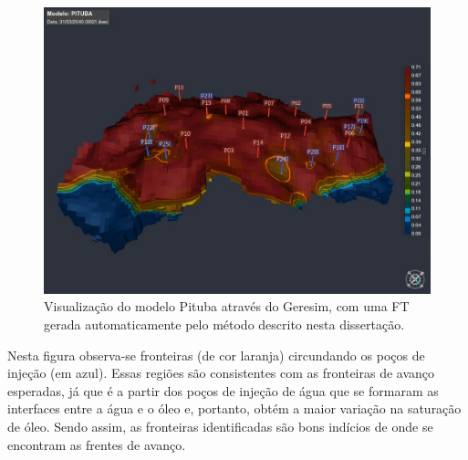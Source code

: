 \begin{figure}[h]
	\centering
	\includegraphics[width=1\textwidth]{images/pituba}
	\caption{Visualização do modelo Pituba através do Geresim, com uma FT gerada automaticamente pelo método descrito nesta dissertação.}
\end{figure}
	
	Nesta figura observa-se fronteiras (de cor laranja) circundando os poços de injeção (em azul). Essas regiões são consistentes com as fronteiras de avanço esperadas, já que é a partir dos poços de injeção de água que se formaram as interfaces entre a água e o óleo e, portanto, obtém a maior variação na saturação de óleo. Sendo assim, as fronteiras identificadas são bons indícios de onde se encontram as frentes de avanço.